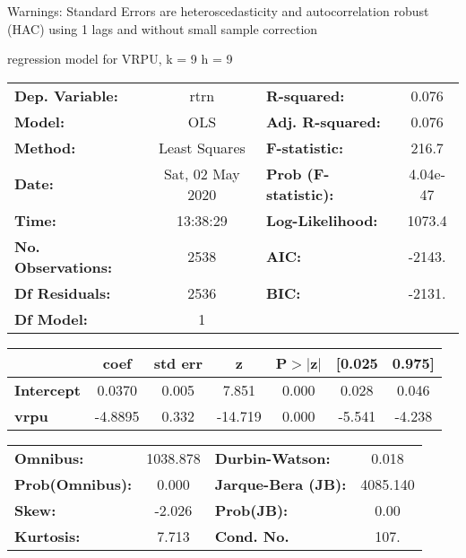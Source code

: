 Warnings: \newline
 [1] Standard Errors are heteroscedasticity and autocorrelation robust (HAC) using 1 lags and without small sample correction\ 

regression model for VRPU, k = 9 h = 9\begin{center}
\begin{tabular}{lclc}
\toprule
\textbf{Dep. Variable:}    &       rtrn       & \textbf{  R-squared:         } &     0.076   \\
\textbf{Model:}            &       OLS        & \textbf{  Adj. R-squared:    } &     0.076   \\
\textbf{Method:}           &  Least Squares   & \textbf{  F-statistic:       } &     216.7   \\
\textbf{Date:}             & Sat, 02 May 2020 & \textbf{  Prob (F-statistic):} &  4.04e-47   \\
\textbf{Time:}             &     13:38:29     & \textbf{  Log-Likelihood:    } &    1073.4   \\
\textbf{No. Observations:} &        2538      & \textbf{  AIC:               } &    -2143.   \\
\textbf{Df Residuals:}     &        2536      & \textbf{  BIC:               } &    -2131.   \\
\textbf{Df Model:}         &           1      & \textbf{                     } &             \\
\bottomrule
\end{tabular}
\begin{tabular}{lcccccc}
                   & \textbf{coef} & \textbf{std err} & \textbf{z} & \textbf{P$> |$z$|$} & \textbf{[0.025} & \textbf{0.975]}  \\
\midrule
\textbf{Intercept} &       0.0370  &        0.005     &     7.851  &         0.000        &        0.028    &        0.046     \\
\textbf{vrpu}      &      -4.8895  &        0.332     &   -14.719  &         0.000        &       -5.541    &       -4.238     \\
\bottomrule
\end{tabular}
\begin{tabular}{lclc}
\textbf{Omnibus:}       & 1038.878 & \textbf{  Durbin-Watson:     } &    0.018  \\
\textbf{Prob(Omnibus):} &   0.000  & \textbf{  Jarque-Bera (JB):  } & 4085.140  \\
\textbf{Skew:}          &  -2.026  & \textbf{  Prob(JB):          } &     0.00  \\
\textbf{Kurtosis:}      &   7.713  & \textbf{  Cond. No.          } &     107.  \\
\bottomrule
\end{tabular}
\end{center}

